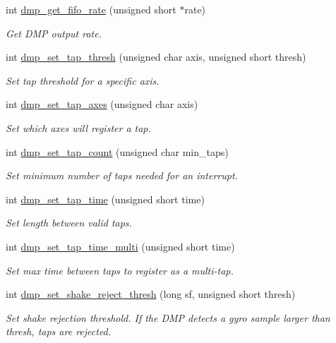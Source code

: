 \begin{DoxyCompactItemize}
int \hyperlink{group___d_r_i_v_e_r_s_gaf3f9953bc04af751b1101700daffa951}{dmp\+\_\+get\+\_\+fifo\+\_\+rate} (unsigned short $\ast$rate)
\begin{DoxyCompactList}\small\item\em Get D\+MP output rate. \end{DoxyCompactList}\item 
int \hyperlink{group___d_r_i_v_e_r_s_ga15da67c0a6c94e0cdaceb8b165e13af9}{dmp\+\_\+set\+\_\+tap\+\_\+thresh} (unsigned char axis, unsigned short thresh)
\begin{DoxyCompactList}\small\item\em Set tap threshold for a specific axis. \end{DoxyCompactList}\item 
int \hyperlink{group___d_r_i_v_e_r_s_ga66bc5c8fc26fcb498df53fc62aa87e4f}{dmp\+\_\+set\+\_\+tap\+\_\+axes} (unsigned char axis)
\begin{DoxyCompactList}\small\item\em Set which axes will register a tap. \end{DoxyCompactList}\item 
int \hyperlink{group___d_r_i_v_e_r_s_ga819f947b2cb107ada7b9a94c41be0dad}{dmp\+\_\+set\+\_\+tap\+\_\+count} (unsigned char min\+\_\+taps)
\begin{DoxyCompactList}\small\item\em Set minimum number of taps needed for an interrupt. \end{DoxyCompactList}\item 
int \hyperlink{group___d_r_i_v_e_r_s_ga97466067f4a23368f4d7e2547fe359d9}{dmp\+\_\+set\+\_\+tap\+\_\+time} (unsigned short time)
\begin{DoxyCompactList}\small\item\em Set length between valid taps. \end{DoxyCompactList}\item 
int \hyperlink{group___d_r_i_v_e_r_s_gaeca250a90eb816eb2609229849481337}{dmp\+\_\+set\+\_\+tap\+\_\+time\+\_\+multi} (unsigned short time)
\begin{DoxyCompactList}\small\item\em Set max time between taps to register as a multi-\/tap. \end{DoxyCompactList}\item 
int \hyperlink{group___d_r_i_v_e_r_s_ga62efdae1330d5bcaf4c75b069ded0ed0}{dmp\+\_\+set\+\_\+shake\+\_\+reject\+\_\+thresh} (long sf, unsigned short thresh)
\begin{DoxyCompactList}\small\item\em Set shake rejection threshold. If the D\+MP detects a gyro sample larger than {\itshape thresh}, taps are rejected. \end{DoxyCompactList}\item 

\end{DoxyCompactItemize}
